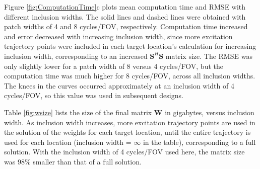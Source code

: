 \par Figure \ref{fig:ComputationTime}c plots mean computation time and RMSE with different inclusion widths. 
The solid lines and dashed lines were obtained with patch widths of 4 and 8 cycles/FOV, respectively. 
Computation time increased and error decreased with increasing inclusion width,
since more excitation trajectory points were included in each target location's calculation for increasing inclusion width,
corresponding to an increased $\bm{S}^H\bm{S}$ matrix size. 
The RMSE was only slightly lower for a patch width of 8 versus 4 cycles/FOV, 
but the computation time was much higher for 8 cycles/FOV, across all inclusion widths. 
The knees in the curves occurred approximately at an inclusion width of 4 cycles/FOV,
so this value was used in subsequent designs. 

\par Table \ref{fig:wsize} lists the size of the final matrix $\bm{W}$ in gigabytes,
versus inclusion width.
As inclusion width increases, more excitation trajectory points are used in the solution of the weights for each target location,
until the entire trajectory is used for each location (inclusion width = $\infty$ in the table),
corresponding to a full solution. 
With the inclusion width of 4 cycles/FOV used here, 
the matrix size was 98\% smaller than that of a full solution.  






